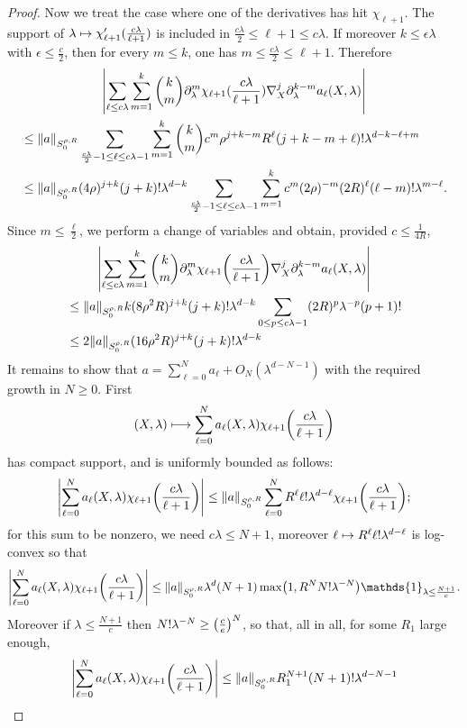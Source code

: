 \documentclass[AHL,Unicode,longabstracts,published]{cedram}
\newcommand\1{\mathds{1}}
\let\oldmapsto\mapsto
\renewcommand*{\mapsto}{\mathchoice{\longmapsto}{\oldmapsto}{\oldmapsto}{\oldmapsto}}
\let\originalleft\left
\let\originalright\right
\renewcommand{\left}{\mathopen{}\mathclose\bgroup\originalleft}
\renewcommand{\right}{\aftergroup\egroup\originalright}
\begin{document}
\begin{proof}
Now we treat the case where one of the derivatives has hit $\chi_{\ell+1}$. The support of $\lambda\mapsto
\chi_{\ell+1}'(\frac{c\lambda}{\ell+1})$ is included in $\frac{c\lambda}{2}\leq \ell+1\leq c\lambda$. If moreover $k\leq
\epsilon \lambda$ with $\epsilon \leq \frac{c}{2}$, then for every $m\leq k$, one has $m\leq \frac{c\lambda}{2}\leq \ell+1$. Therefore
\begin{multline*}
\left|\sum_{\ell\leq c\lambda}\sum_{m=1}^{k}\binom{k}{m}\partial_{\lambda}^m\chi_{\ell+1}(\frac{c\lambda}{\ell+1})\nabla^j_X\partial^{k-m}_{\lambda}a_{\ell}(X,\lambda)\right|\\
\begin{aligned}
&\leq\|a\|_{S^{\rho,R}_0}\sum_{\frac{c\lambda}{2}-1\leq\ell\leq c\lambda-1}\sum_{m=1}^k\binom{k}{m}c^m\rho^{j+k-m}R^\ell(j+k-m+\ell)!\lambda^{d-k-\ell+m}\\
&\leq \|a\|_{S^{\rho,R}_0}(4\rho)^{j+k}(j+k)!\lambda^{d-k}\sum_{\frac{c\lambda}{2}-1\leq\ell\leq c\lambda-1}\sum_{m=1}^kc^m(2\rho)^{-m}(2R)^{\ell}(\ell-m)!\lambda^{m-\ell}.
\end{aligned}
\end{multline*}
Since $m\leq \frac{\ell}{2}$, we perform a change of variables and obtain, provided $c\leq\frac{1}{4R}$,
\begin{multline*}
\left|\sum_{\ell\leq c\lambda}\sum_{m=1}^{k}\binom{k}{m}\partial_{\lambda}^m\chi_{\ell+1}\left(\frac{c\lambda}{\ell+1}\right)\nabla^j_X\partial^{k-m}_{\lambda}a_{\ell}(X,\lambda)\right|\\
\begin{aligned}
&\leq
\|a\|_{S^{\rho,R}_0}k(8\rho^2R)^{j+k}(j+k)!\lambda^{d-k}\sum_{0\leq p\leq c\lambda-1}(2R)^p\lambda^{-p}(p+1)!\\
&\leq 2\|a\|_{S^{\rho,R}_0}(16\rho^2R)^{j+k}(j+k)!\lambda^{d-k}
\end{aligned}
\end{multline*}
It remains to show that $a=\sum_{\ell=0}^Na_\ell+O_N(\lambda^{d-N-1})$ with the required growth in $N\geq 0$. First
\[
(X,\lambda)\mapsto\sum_{\ell=0}^Na_\ell(X,\lambda)\chi_{\ell+1}\left(\frac{c\lambda}{\ell+1}\right)
\]
has compact support, and is uniformly bounded as follows:
\[
\left|\sum_{\ell=0}^Na_\ell(X,\lambda)\chi_{\ell+1}\left(\frac{c\lambda}{\ell+1}\right)\right|
\leq
\|a\|_{S^{\rho,R}_0}\sum_{\ell=0}^NR^{\ell}\ell!\lambda^{d-\ell}\chi_{\ell+1}\left(\frac{c\lambda}{\ell+1}\right);
\]
for this sum to be nonzero, we need $c\lambda\leq N+1$, moreover $\ell\mapsto R^{\ell}\ell!\lambda^{d-\ell}$ is log-convex so that
\[
\left|\sum_{\ell=0}^Na_\ell(X,\lambda)\chi_{\ell+1}\left(\frac{c\lambda}{\ell+1}\right)\right|
\leq
\|a\|_{S^{\rho,R}_0}\lambda^d(N+1)\max\left(1,R^NN!\lambda^{-N}\right)\1_{\lambda\leq
\frac{N+1}{c}}.
\]
Moreover if $\lambda\leq \frac{N+1}{c}$ then $N!\lambda^{-N}\geq
\left(\frac{c}{e}\right)^N$, so that, all in all, for some $R_1$ large enough,
\[
\left|\sum_{\ell=0}^Na_\ell(X,\lambda)\chi_{\ell+1}\left(\frac{c\lambda}{\ell+1}\right)\right|
\leq
\|a\|_{S^{\rho,R}_0}R_1^{N+1}(N+1)!\lambda^{d-N-1}
\]


\end{proof}
\end{document}
